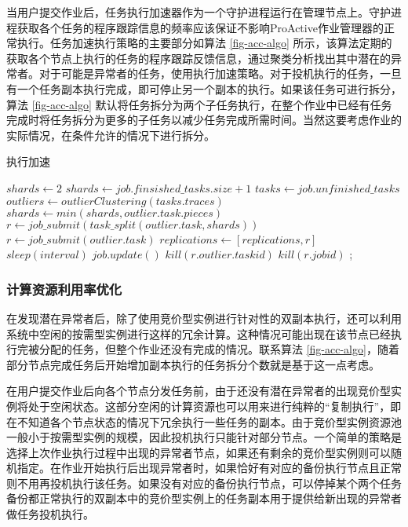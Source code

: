 当用户提交作业后，任务执行加速器作为一个守护进程运行在管理节点上。守护进程获取各个任务的程序跟踪信息的频率应该保证不影响ProActive作业管理器的正常执行。任务加速执行策略的主要部分如算法 \ref{fig-acc-algo} 所示，该算法定期的获取各个节点上执行的任务的程序跟踪反馈信息，通过聚类分析找出其中潜在的异常者。对于可能是异常者的任务，使用执行加速策略。对于投机执行的任务，一旦有一个任务副本执行完成，即可停止另一个副本的执行。如果该任务可进行拆分，算法 \ref{fig-acc-algo} 默认将任务拆分为两个子任务执行，在整个作业中已经有任务完成时将任务拆分为更多的子任务以减少任务完成所需时间。当然这要考虑作业的实际情况，在条件允许的情况下进行拆分。
\begin{algorithm}
\caption{执行加速}
\label{fig-acc-algo}
$shards\gets 2$
{
  {
    $shards\gets job.finsished\_tasks.size + 1$\;
  }
  $tasks\gets job.unfinished\_tasks$\;
  $outliers\gets outlierClustering(tasks.traces)$\;
  {
    {
      {
        $shards\gets min(shards, outlier.task.pieces)$\;
        $r\gets job\_submit(task\_split(outlier.task, shards))$\;
      }{
        $r\gets job\_submit(outlier.task)$\;
      }
      $replications\gets [replications, r]$\;
    }
  }
  $sleep(interval)$\;
  $job.update()$\;
  {
    {
      $kill(r.outlier.taskid)$\;
    }
    {
      $kill(r.jobid)$\;
    }
  }
}
;
\end{algorithm}

\subsubsection{计算资源利用率优化}
在发现潜在异常者后，除了使用竞价型实例进行针对性的双副本执行，还可以利用系统中空闲的按需型实例进行这样的冗余计算。这种情况可能出现在该节点已经执行完被分配的任务，但整个作业还没有完成的情况。联系算法 \ref{fig-acc-algo}，随着部分节点完成任务后开始增加副本执行的任务拆分个数就是基于这一点考虑。

在用户提交作业后向各个节点分发任务前，由于还没有潜在异常者的出现竞价型实例将处于空闲状态。这部分空闲的计算资源也可以用来进行纯粹的``复制执行''，即在不知道各个节点状态的情况下冗余执行一些任务的副本。由于竞价型实例资源池一般小于按需型实例的规模，因此投机执行只能针对部分节点。一个简单的策略是选择上次作业执行过程中出现的异常者节点，如果还有剩余的竞价型实例则可以随机指定。在作业开始执行后出现异常者时，如果恰好有对应的备份执行节点且正常则不用再投机执行该任务。如果没有对应的备份执行节点，可以停掉某个两个任务备份都正常执行的双副本中的竞价型实例上的任务副本用于提供给新出现的异常者做任务投机执行。

